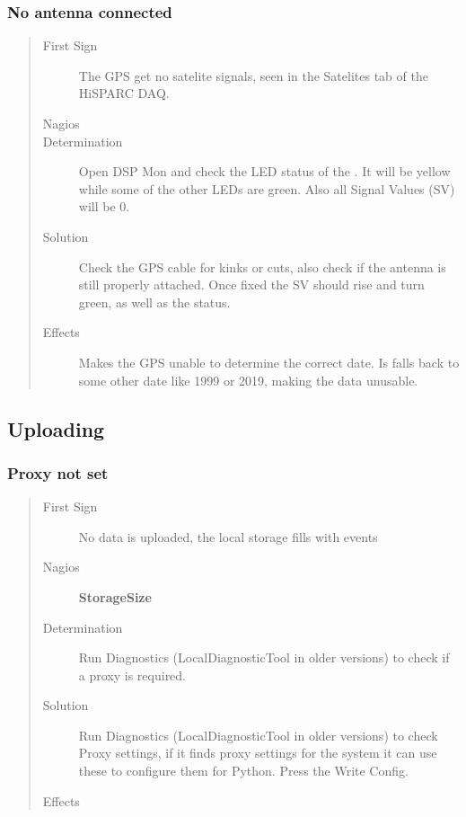 \documentclass[a4paper,11pt,english]{sphinxmanual}
\begin{document}
\subsubsection{No antenna connected}
\label{known-issues:no-antenna-connected}\begin{quote}\begin{description}
\item[{First Sign}] \leavevmode
The GPS get no satelite signals, seen in the Satelites tab of the HiSPARC DAQ.

\item[{Nagios}] \leavevmode
\item[{Determination}] \leavevmode
Open DSP Mon and check the LED status of the . It will be yellow while some of the other LEDs are green. Also all Signal Values (SV) will be 0.

\item[{Solution}] \leavevmode
Check the GPS cable for kinks or cuts, also check if the antenna is still properly attached. Once fixed the SV should rise and turn green, as well as the  status.

\item[{Effects}] \leavevmode
Makes the GPS unable to determine the correct date. Is falls back to some other date like 1999 or 2019, making the data unusable.

\end{description}\end{quote}


\subsection{Uploading}
\label{known-issues:uploading}

\subsubsection{Proxy not set}
\label{known-issues:proxy-not-set}\begin{quote}\begin{description}
\item[{First Sign}] \leavevmode
No data is uploaded, the local storage fills with events

\item[{Nagios}] \leavevmode
\textbf{StorageSize}

\item[{Determination}] \leavevmode
Run Diagnostics (LocalDiagnosticTool in older versions) to check if a proxy is required.

\item[{Solution}] \leavevmode
Run Diagnostics (LocalDiagnosticTool in older versions) to check Proxy settings, if it finds proxy settings for the system it can use these to configure them for Python. Press the Write Config.

\item[{Effects}] \leavevmode
\end{description}\end{quote}
\end{document}
